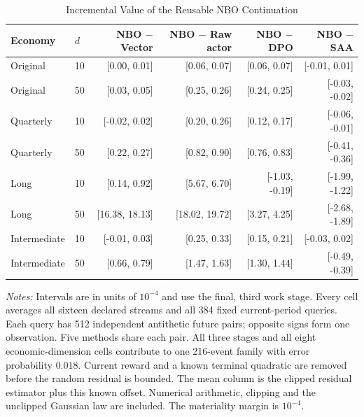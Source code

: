 \begin{table}[!htbp]
\centering\footnotesize
\caption{Incremental Value of the Reusable NBO Continuation}\label{tab:r16menucomparisons}
\begin{tabular}{llrrrr}
\toprule
Economy & $d$ & NBO $-$ Vector & NBO $-$ Raw actor & NBO $-$ DPO & NBO $-$ SAA \\
\midrule
Original & 10 & [0.00, 0.01] & [0.06, 0.07] & [0.06, 0.07] & [-0.01, 0.01] \\
Original & 50 & [0.03, 0.05] & [0.25, 0.26] & [0.24, 0.25] & [-0.03, -0.02] \\
Quarterly & 10 & [-0.02, 0.02] & [0.20, 0.26] & [0.12, 0.17] & [-0.06, -0.01] \\
Quarterly & 50 & [0.22, 0.27] & [0.82, 0.90] & [0.76, 0.83] & [-0.41, -0.36] \\
Long & 10 & [0.14, 0.92] & [5.67, 6.70] & [-1.03, -0.19] & [-1.99, -1.22] \\
Long & 50 & [16.38, 18.13] & [18.02, 19.72] & [3.27, 4.25] & [-2.68, -1.89] \\
Intermediate & 10 & [-0.01, 0.03] & [0.25, 0.33] & [0.15, 0.21] & [-0.03, 0.02] \\
Intermediate & 50 & [0.66, 0.79] & [1.47, 1.63] & [1.30, 1.44] & [-0.49, -0.39] \\
\bottomrule
\end{tabular}
\begin{minipage}{0.97\linewidth}\footnotesize\emph{Notes:} Intervals are in units of $10^{-4}$ and use the final, third work stage. Every cell averages all sixteen declared streams and all 384 fixed current-period queries. Each query has 512 independent antithetic future pairs; opposite signs form one observation. Five methods share each pair. All three stages and all eight economic-dimension cells contribute to one 216-event family with error probability $0.018$. Current reward and a known terminal quadratic are removed before the random residual is bounded. The mean column is the clipped residual estimator plus this known offset. Numerical arithmetic, clipping and the unclipped Gaussian law are included. The materiality margin is $10^{-4}$.
\end{minipage}
\end{table}
